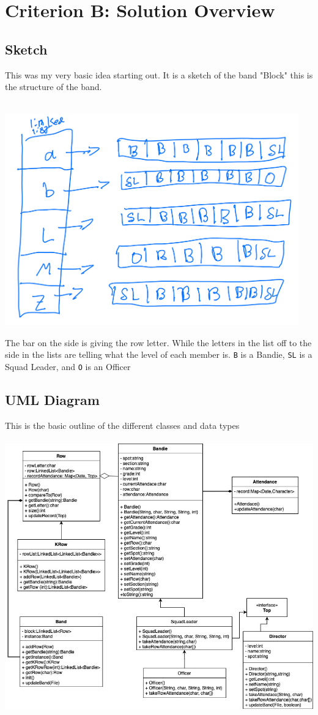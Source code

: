 \documentclass{article}
\begin{document}
\section{Criterion B: Solution Overview}
\subsection{Sketch}
This was my very basic idea starting out. It is a sketch of the band "Block" this is the structure  of the band.\\ \\
\begin{center}
	\includegraphics[width=5in]{sketch.jpg}\\
\end{center}
The bar on the side is giving the row letter. While the letters in the list off to the side in the lists are telling what the level of each member is. \verb|B| is a Bandie, \verb|SL| is a Squad Leader, and \verb|O| is an Officer
\subsection{UML Diagram}
This is the basic outline of the different classes and data types \\ \\
\includegraphics[width=6in]{IA UML and Flowchart-UML.jpg}
\end{document}
